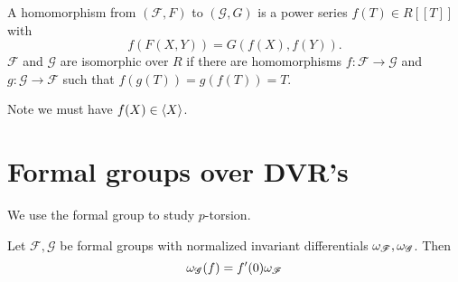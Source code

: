 \begin{df}
A homomorphism from $(\mathscr F,F)$ to $(\mathscr G,G)$ is a power series $f(T)\in R[[T]]$ with
\[
f(F(X,Y))=G(f(X),f(Y)).
\]
$\mathscr F$ and $\mathscr G$ are isomorphic over $R$ if there are homomorphisms $f:\mathscr F\to \mathscr G$ and $g:\mathscr G\to \mathscr F$ such that $f(g(T))=g(f(T))=T$.
\end{df}
Note we must have $f(X)\in \left\langle {X}\right\rangle$.
%
%
%
\section{Formal groups over DVR's}
We use the formal group to study $p$-torsion. 
\begin{pr}[Silverman IV.4.3]
Let $\mathscr F,\mathscr G$ be formal groups with normalized invariant differentials $\omega_{\mathscr F},\omega_{\mathscr G}$. Then
\[
\omega_{\mathscr G}(f)=f'(0) \omega_{\mathscr F}
\]
\end{pr}

